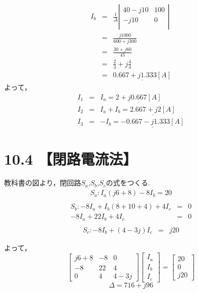 \documentclass[a4j, titlepage, dvipdfmx]{jarticle}
\begin{document}
\begin{eqnarray}
    I_b &=& \frac{1}{\Delta}
    \left|
    \begin{array}{rr}
        40-j10 & 100  \\
        -j10 & 0  \\
      \end{array}
    \right| \\
    &=& \frac{j1000}{600+j300} \\
    &=& \frac{30+j60}{45} \\
    &=& \frac{2}{3} + j \frac{4}{3} \\
    &=& \underline{0.667+j1.333[A]}
\end{eqnarray}
よって，
\begin{eqnarray}
    I_1 &=& I_a = \underline{2+j0.667[A]} \\
    I_2 &=& I_a+I_b= \underline{2.667+j2[A]} \\
    I_3 &=& -I_b = \underline{-0.667 - j1.333[A]}
\end{eqnarray}
\newpage

\section*{10.4 【閉路電流法】}
教科書の図より，閉回路$S_a$,$S_b$,$S_c$の式をつくる.
\begin{eqnarray}
    S_a : I_a (j6+8)-8I_b=20\\
\end{eqnarray}
\begin{eqnarray}
    S_b : -8 I_a+I_b(8+10+4)+4I_c&=&0\\
    -8 I_a+22I_b+4I_c &=& 0\\
\end{eqnarray}
\begin{eqnarray}
    S_c : -8I_b + (4-3j)I_c &=& j20
\end{eqnarray}

よって，
\[
  \left[
    \begin{array}{rrr}
      j6+8 & -8 & 0  \\
      -8 & 22 & 4  \\
      0 & 4 & 4-3j
    \end{array}
  \right]
  \left[
    \begin{array}{rrr}
      I_a  \\
      I_b \\
      I_c
    \end{array}
  \right] =
  \left[
    \begin{array}{c}
      20  \\
      0 \\
      j20
    \end{array}
  \right]
\]
\begin{equation}
    \Delta = 716 + j96
\end{equation}
\end{document}
